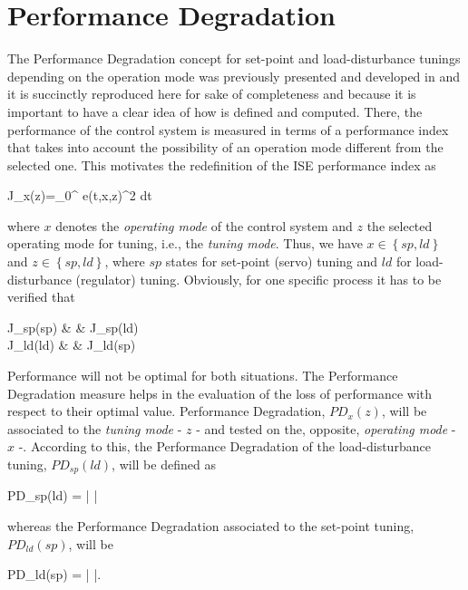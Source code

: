 %
\section{Performance Degradation}
\label{performance-analysis}
%

The Performance Degradation concept for set-point and
load-disturbance tunings depending on the operation mode was
previously presented and developed in \cite{arrietaCSC2007} and it
is succinctly reproduced here for sake of completeness and because
it is important to have a clear idea of how is defined and
computed. There, the performance of the control system is measured
in terms of a performance index that takes into account the
possibility of an operation mode different from the selected one.
This motivates the redefinition of the ISE performance index as

\be J_x(z)=\int_0^{\infty} e(t,x,z)^2 dt
\label{generic_index_operating_mode} \ee

\noindent where $x$ denotes the \emph{operating mode} of the
control system and $z$ the selected operating mode for tuning,
i.e., the \emph{tuning mode}. Thus, we have $x \in
\left\{sp,ld\right\}$ and $z \in \left\{sp,ld\right\}$, where $sp$
states for set-point (servo) tuning and $ld$ for load-disturbance
(regulator) tuning. Obviously, for one specific process it has to
be verified that

\bea J_{sp}(sp) & \leq & J_{sp}(ld) \nonumber\\
J_{ld}(ld) & \leq & J_{ld}(sp) \nonumber \eea

Performance will not be optimal for both situations. The
Performance Degradation measure helps in the evaluation of the
loss of performance with respect to their optimal value.
Performance Degradation, $PD_x(z)$, will be associated to the
\emph{tuning mode} - $z$ -  and tested on the, opposite,
\emph{operating mode} - $x$ -. According to this, the Performance
Degradation of the load-disturbance tuning, $PD_{sp}(ld)$, will be
defined as

\be PD_{sp}(ld) = \left |  \right | \label{PD_load_disturbance} \ee

\noindent whereas the Performance Degradation associated to the
set-point tuning, $PD_{ld}(sp)$, will be

\be PD_{ld}(sp) = \left |  \right |. \label{PD_set_point} \ee

